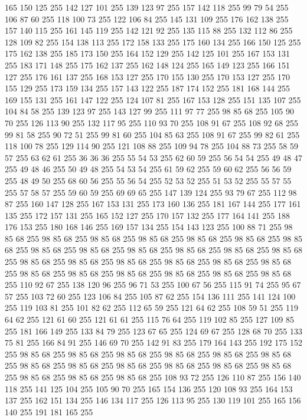 165 150 125 255 142 127 101 255 139 123 97 255 157 142 118 255 99 79 54 255 106 87 60 255 118 100 73 255 122 106 84 255 145 131 109 255 176 162 138 255 157 140 115 255 161 145 119 255 142 121 92 255 135 115 88 255 132 112 86 255 128 109 82 255 154 138 113 255 172 158 133 255 175 160 134 255 166 150 125 255 175 162 138 255 185 173 150 255 164 152 129 255 142 125 101 255 167 153 131 255 183 171 148 255 175 162 137 255 162 148 124 255 165 149 123 255 166 151 127 255 176 161 137 255 168 153 127 255 170 155 130 255 170 153 127 255 170 155 129 255 173 159 134 255 157 143 122 255 187 174 152 255 181 168 144 255 169 155 131 255 161 147 122 255 124 107 81 255 167 153 128 255 151 135 107 255 104 84 58 255 139 123 97 255 143 127 99 255 111 97 77 255 98 85 68 255 105 90 70 255 126 113 90 255 132 117 95 255 110 93 70 255 108 91 67 255 108 92 68 255 99 81 58 255 90 72 51 255 99 81 60 255 104 85 63 255 108 91 67 255 99 82 61 255 118 100 78 255 129 114 90 255 121 108 88 255
109 94 78 255 104 88 73 255 58 59 57 255 63 62 61 255 36 36 36 255 55 54 53 255 62 60 59 255 56 54 54 255 49 48 47 255 49 48 46 255 50 49 48 255 54 53 54 255 61 59 62 255 59 60 62 255 56 56 59 255 48 49 50 255 68 60 56 255 55 56 54 255 52 53 52 255 51 53 52 255 55 57 55 255 57 58 57 255 59 60 59 255 69 69 65 255 147 139 124 255 93 79 67 255 112 98 87 255 160 147 128 255 167 153 131 255 173 160 136 255 181 167 144 255 177 161 135 255 172 157 131 255 165 152 127 255 170 157 132 255 177 164 141 255 188 176 153 255 180 168 146 255 169 157 134 255 154 143 123 255 100 88 71 255 98 85 68 255 98 85 68 255 98 85 68 255 98 85 68 255 98 85 68 255 98 85 68 255 98 85 68 255 98 85 68 255 98 85 68 255 98 85 68 255 98 85 68 255 98 85 68 255 98 85 68 255 98 85 68 255 98 85 68 255 98 85 68 255 98 85 68 255 98 85 68 255 98 85 68 255 98 85 68 255 98 85 68 255 98 85 68 255 98 85 68 255
98 85 68 255 98 85 68 255 110 92 67 255 138 120 96 255 96 71 53 255 100 67 56 255 115 91 74 255 95 67 57 255 103 72 60 255 123 106 84 255 105 87 62 255 154 136 111 255 141 124 100 255 119 103 81 255 101 82 62 255 112 65 59 255 121 64 62 255 108 59 51 255 119 64 62 255 121 61 60 255 121 61 61 255 115 76 64 255 119 102 85 255 127 109 85 255 181 166 149 255 133 84 79 255 123 67 65 255 124 69 67 255 128 68 70 255 133 75 81 255 166 84 91 255 146 69 70 255 142 91 83 255 179 164 143 255 192 175 152 255 98 85 68 255 98 85 68 255 98 85 68 255 98 85 68 255 98 85 68 255 98 85 68 255 98 85 68 255 98 85 68 255 98 85 68 255 98 85 68 255 98 85 68 255 98 85 68 255 98 85 68 255 98 85 68 255 98 85 68 255 108 93 72 255 126 110 87 255 156 140 118 255 141 125 104 255 105 90 70 255 165 154 136 255 120 108 93 255 164 153 137 255 162 151 134 255 146 134 117 255 126 113 95 255 130 119 101 255 165 156 140 255 191 181 165 255
